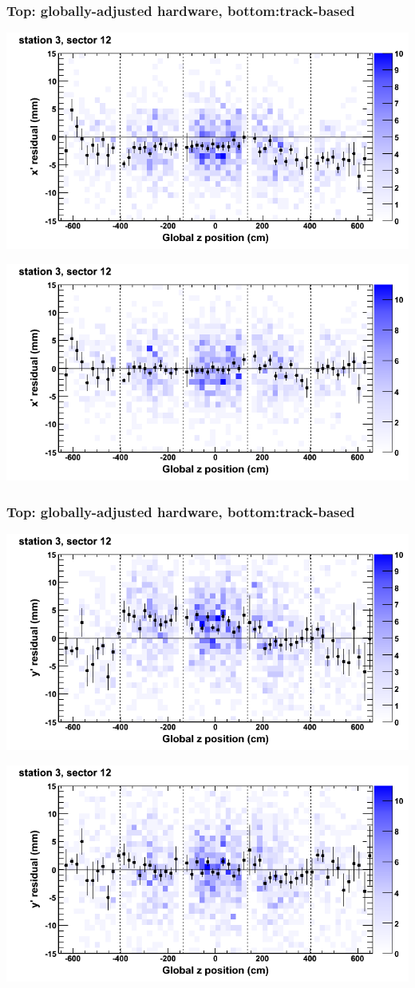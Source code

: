 \documentclass[compress]{beamer}
\begin{document}
\begin{frame}
\frametitle{Top: globally-adjusted hardware, bottom:track-based}
\includegraphics[width=0.7\linewidth]{NOV4_mapplots_HW/DTvsz_st3sec12_x.png}

\includegraphics[width=0.7\linewidth]{NOV4_mapplots/DTvsz_st3sec12_x.png}
\end{frame}

\begin{frame}
\frametitle{Top: globally-adjusted hardware, bottom:track-based}
\includegraphics[width=0.7\linewidth]{NOV4_mapplots_HW/DTvsz_st3sec12_y.png}

\includegraphics[width=0.7\linewidth]{NOV4_mapplots/DTvsz_st3sec12_y.png}
\end{frame}
\end{document}
